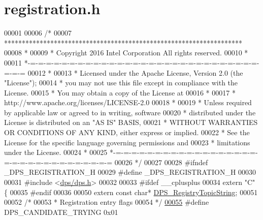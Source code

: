 \hypertarget{registration_8h_source}{}\section{registration.\+h}
\label{registration_8h_source}

\begin{DoxyCode}
00001 
00006 \textcolor{comment}{/*}
00007 \textcolor{comment}{ *******************************************************************}
00008 \textcolor{comment}{ *}
00009 \textcolor{comment}{ * Copyright 2016 Intel Corporation All rights reserved.}
00010 \textcolor{comment}{ *}
00011 \textcolor{comment}{ *-=-=-=-=-=-=-=-=-=-=-=-=-=-=-=-=-=-=-=-=-=-=-=-=-=-=-=-=-=-=-=-=}
00012 \textcolor{comment}{ *}
00013 \textcolor{comment}{ * Licensed under the Apache License, Version 2.0 (the "License");}
00014 \textcolor{comment}{ * you may not use this file except in compliance with the License.}
00015 \textcolor{comment}{ * You may obtain a copy of the License at}
00016 \textcolor{comment}{ *}
00017 \textcolor{comment}{ *      http://www.apache.org/licenses/LICENSE-2.0}
00018 \textcolor{comment}{ *}
00019 \textcolor{comment}{ * Unless required by applicable law or agreed to in writing, software}
00020 \textcolor{comment}{ * distributed under the License is distributed on an "AS IS" BASIS,}
00021 \textcolor{comment}{ * WITHOUT WARRANTIES OR CONDITIONS OF ANY KIND, either express or implied.}
00022 \textcolor{comment}{ * See the License for the specific language governing permissions and}
00023 \textcolor{comment}{ * limitations under the License.}
00024 \textcolor{comment}{ *}
00025 \textcolor{comment}{ *-=-=-=-=-=-=-=-=-=-=-=-=-=-=-=-=-=-=-=-=-=-=-=-=-=-=-=-=-=-=-=-=}
00026 \textcolor{comment}{ */}
00027 
00028 \textcolor{preprocessor}{#ifndef \_DPS\_REGISTRATION\_H}
00029 \textcolor{preprocessor}{#define \_DPS\_REGISTRATION\_H}
00030 
00031 \textcolor{preprocessor}{#include <\hyperlink{dps_8h}{dps/dps.h}>}
00032 
00033 \textcolor{preprocessor}{#ifdef \_\_cplusplus}
00034 \textcolor{keyword}{extern} \textcolor{stringliteral}{"C"} \{
00035 \textcolor{preprocessor}{#endif}
00036 
00050 \textcolor{keyword}{extern} \textcolor{keyword}{const} \textcolor{keywordtype}{char}* \hyperlink{group__registration_ga7c1111f95ed473c1b27fa3c9ee096796}{DPS\_RegistryTopicString};
00051 
00052 \textcolor{comment}{/*}
00053 \textcolor{comment}{ * Registration entry flags}
00054 \textcolor{comment}{ */}
\hyperlink{group__registration_ga06a44e56022098c9464bd881cf5efe20}{00055} \textcolor{preprocessor}{#define DPS\_CANDIDATE\_TRYING   0x01  }

\end{DoxyCode}
